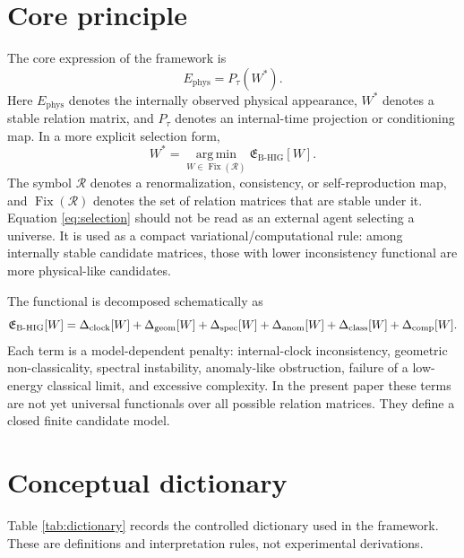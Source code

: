 \documentclass[11pt,a4paper]{article}
\newcommand{\Wstar}{W^{\ast}}
\newcommand{\Ephys}{E_{\mathrm{phys}}}
\newcommand{\Etot}{\mathfrak{E}_{\mathrm{B\text{-}HIG}}}
\newcommand{\Fix}{\operatorname{Fix}}
\newcommand{\argmin}{\operatorname*{arg\,min}}
\begin{document}
\section{Core principle}
The core expression of the framework is
\begin{equation}
\boxed{\Ephys=P_{\tau}(\Wstar)} .
\label{eq:core}
\end{equation}
Here $\Ephys$ denotes the internally observed physical appearance, $\Wstar$ denotes a stable relation matrix, and $P_{\tau}$ denotes an internal-time projection or conditioning map. In a more explicit selection form,
\begin{equation}
\boxed{\Wstar=\argmin_{W\in \Fix(\mathcal{R})}\Etot[W]} .
\label{eq:selection}
\end{equation}
The symbol $\mathcal{R}$ denotes a renormalization, consistency, or self-reproduction map, and $\Fix(\mathcal{R})$ denotes the set of relation matrices that are stable under it. Equation \eqref{eq:selection} should not be read as an external agent selecting a universe. It is used as a compact variational/computational rule: among internally stable candidate matrices, those with lower inconsistency functional are more physical-like candidates.

The functional is decomposed schematically as
\begin{equation}
\Etot[W]=
\Delta_{\rm clock}[W]+
\Delta_{\rm geom}[W]+
\Delta_{\rm spec}[W]+
\Delta_{\rm anom}[W]+
\Delta_{\rm class}[W]+
\Delta_{\rm comp}[W] .
\label{eq:total_loss}
\end{equation}
Each term is a model-dependent penalty: internal-clock inconsistency, geometric non-classicality, spectral instability, anomaly-like obstruction, failure of a low-energy classical limit, and excessive complexity. In the present paper these terms are not yet universal functionals over all possible relation matrices. They define a closed finite candidate model.

\section{Conceptual dictionary}
Table \ref{tab:dictionary} records the controlled dictionary used in the framework. These are definitions and interpretation rules, not experimental derivations.
\end{document}

